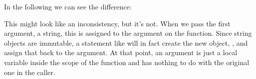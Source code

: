 \documentclass[a4paper,10pt,english]{sphinxmanual}
\begin{document}
In the following we can see the difference:

\begin{sphinxVerbatim}[commandchars=\\\{\}]
 
      
    
  
  
\end{sphinxVerbatim}

This might look like an inconsistency, but it’s not. When we pass the first argument, a string, this is
assigned to the argument on the function. Since string objects are immutable, a statement like
 will in fact create the new object, , and assign
that back to the argument. At that point, an argument is just a local variable inside the scope of the
function and has nothing to do with the original one in the caller.
\end{document}
